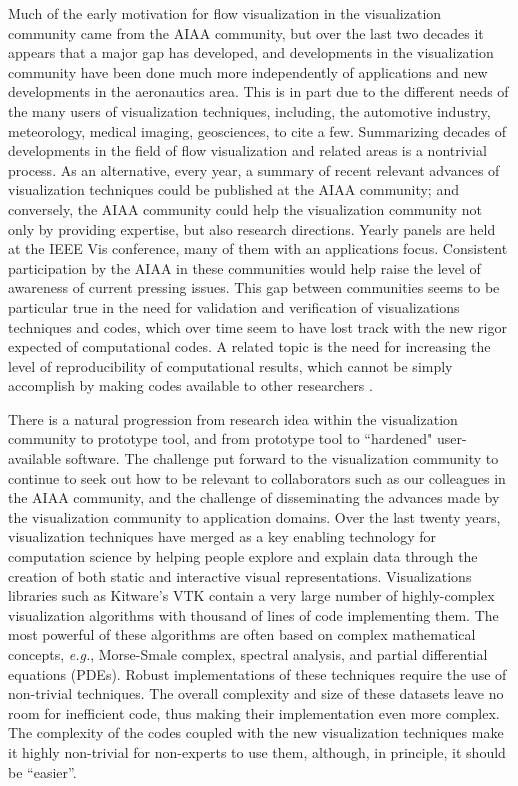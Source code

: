 Much of the early motivation for flow visualization in the
visualization community came from the AIAA community, but over the last
two decades it appears that a major gap has developed, and
developments in the visualization community have been done much more
independently of applications and new developments in the aeronautics
area. This is in part due to the different needs of the many users of 
visualization techniques, including, the automotive industry, meteorology, 
medical imaging, geosciences, to cite a few. 
Summarizing decades of developments in the field of flow visualization and
related areas is a nontrivial process. As an alternative,
every year, a summary of recent relevant advances of visualization techniques could be 
published at the AIAA community; and conversely, the AIAA 
community could help the visualization community not only by providing
expertise, but also research directions\cite{Munzner:2006:NVR:1128586.1128614}.
Yearly panels are held at the IEEE Vis conference, many of them with an applications
focus.  Consistent participation by the AIAA in these communities would help
raise the level of awareness of current pressing issues.
%
This gap between communities seems 
to be particular true in the need for validation and
verification of visualizations techniques and codes, which over time
seem to have lost track with the new rigor expected of computational
codes. A related topic is the need for increasing the level of
reproducibility of computational results, which cannot be simply
accomplish by making codes available to other researchers
\cite{Silva:2007:PVR:1300781.1302461}.

There is a natural progression from research idea within the 
visualization community to prototype tool,  and from prototype tool to 
``hardened" user-available software.  The challenge put forward to the 
visualization community to continue to seek out how to be relevant to 
collaborators such as our colleagues in the AIAA community, and
the challenge of disseminating the advances made by the visualization 
community to application domains.
Over the last twenty years, visualization techniques have merged as a
key enabling technology for computation science by helping people
explore and explain data through the creation of both static and
interactive visual representations. Visualizations libraries such as
Kitware's VTK contain a very large number of highly-complex
visualization algorithms with thousand of lines of code implementing
them. 
The most powerful of these algorithms are often based on complex
mathematical concepts, {\em e.g.}, Morse-Smale complex, spectral
analysis, and partial differential equations (PDEs). Robust
implementations of these techniques require the use of non-trivial
techniques. The overall complexity and size of these datasets leave no
room for inefficient code, thus making their implementation even more
complex. The complexity of the codes coupled with the new
visualization techniques make it highly non-trivial for non-experts to
use them, although, in principle, it should be ``easier''. 

